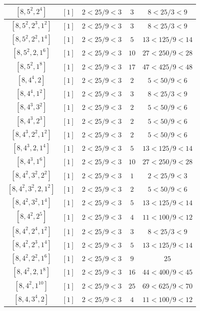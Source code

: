 \documentclass{article}%
\begin{document}
\begin{center}
\begin{longtable}{||c|c|c|c|c||}
$[8, 5^{2}, 2^{4}]$ & $[1]$ & $2 < 25/9 < 3$ & $3$ & $8 < 25/3 < 9$ \\ \hline 
$[8, 5^{2}, 2^{3}, 1^{2}]$ & $[1]$ & $2 < 25/9 < 3$ & $3$ & $8 < 25/3 < 9$ \\ \hline 
$[8, 5^{2}, 2^{2}, 1^{4}]$ & $[1]$ & $2 < 25/9 < 3$ & $5$ & $13 < 125/9 < 14$ \\ \hline 
$[8, 5^{2}, 2, 1^{6}]$ & $[1]$ & $2 < 25/9 < 3$ & $10$ & $27 < 250/9 < 28$ \\ \hline 
$[8, 5^{2}, 1^{8}]$ & $[1]$ & $2 < 25/9 < 3$ & $17$ & $47 < 425/9 < 48$ \\ \hline 
$[8, 4^{4}, 2]$ & $[1]$ & $2 < 25/9 < 3$ & $2$ & $5 < 50/9 < 6$ \\ \hline 
$[8, 4^{4}, 1^{2}]$ & $[1]$ & $2 < 25/9 < 3$ & $3$ & $8 < 25/3 < 9$ \\ \hline 
$[8, 4^{3}, 3^{2}]$ & $[1]$ & $2 < 25/9 < 3$ & $2$ & $5 < 50/9 < 6$ \\ \hline 
$[8, 4^{3}, 2^{3}]$ & $[1]$ & $2 < 25/9 < 3$ & $2$ & $5 < 50/9 < 6$ \\ \hline 
$[8, 4^{3}, 2^{2}, 1^{2}]$ & $[1]$ & $2 < 25/9 < 3$ & $2$ & $5 < 50/9 < 6$ \\ \hline 
$[8, 4^{3}, 2, 1^{4}]$ & $[1]$ & $2 < 25/9 < 3$ & $5$ & $13 < 125/9 < 14$ \\ \hline 
$[8, 4^{3}, 1^{6}]$ & $[1]$ & $2 < 25/9 < 3$ & $10$ & $27 < 250/9 < 28$ \\ \hline 
$[8, 4^{2}, 3^{2}, 2^{2}]$ & $[1]$ & $2 < 25/9 < 3$ & $1$ & $2 < 25/9 < 3$ \\ \hline 
$[8, 4^{2}, 3^{2}, 2, 1^{2}]$ & $[1]$ & $2 < 25/9 < 3$ & $2$ & $5 < 50/9 < 6$ \\ \hline 
$[8, 4^{2}, 3^{2}, 1^{4}]$ & $[1]$ & $2 < 25/9 < 3$ & $5$ & $13 < 125/9 < 14$ \\ \hline 
$[8, 4^{2}, 2^{5}]$ & $[1]$ & $2 < 25/9 < 3$ & $4$ & $11 < 100/9 < 12$ \\ \hline 
$[8, 4^{2}, 2^{4}, 1^{2}]$ & $[1]$ & $2 < 25/9 < 3$ & $3$ & $8 < 25/3 < 9$ \\ \hline 
$[8, 4^{2}, 2^{3}, 1^{4}]$ & $[1]$ & $2 < 25/9 < 3$ & $5$ & $13 < 125/9 < 14$ \\ \hline 
$[8, 4^{2}, 2^{2}, 1^{6}]$ & $[1]$ & $2 < 25/9 < 3$ & $9$ & $25$ \\ \hline 
$[8, 4^{2}, 2, 1^{8}]$ & $[1]$ & $2 < 25/9 < 3$ & $16$ & $44 < 400/9 < 45$ \\ \hline 
$[8, 4^{2}, 1^{10}]$ & $[1]$ & $2 < 25/9 < 3$ & $25$ & $69 < 625/9 < 70$ \\ \hline 
$[8, 4, 3^{4}, 2]$ & $[1]$ & $2 < 25/9 < 3$ & $4$ & $11 < 100/9 < 12$ \\ \hline 

\end{longtable}
\end{center}
\end{document}
